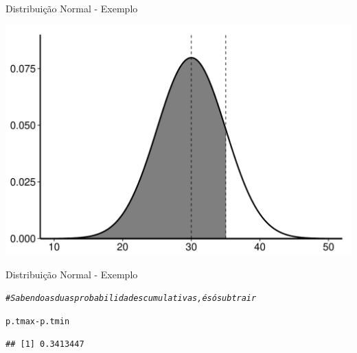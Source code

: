 \documentclass{beamer}\usepackage[]{graphicx}\usepackage[]{color}
\makeatletter
\def\maxwidth{ %
  \ifdim\Gin@nat@width>\linewidth
    \linewidth
  \else
    \Gin@nat@width
  \fi
}
\newcommand{\hlcom}[1]{\textcolor[rgb]{0.678,0.584,0.686}{\textit{#1}}}%
\newcommand{\hlopt}[1]{\textcolor[rgb]{0,0,0}{#1}}%
\newcommand{\hlstd}[1]{\textcolor[rgb]{0.345,0.345,0.345}{#1}}%
\newenvironment{kframe}{%
 \def\at@end@of@kframe{}%
 \ifinner\ifhmode%
  \def\at@end@of@kframe{\end{minipage}}%
  \begin{minipage}{\columnwidth}%
 \fi\fi%
 \def\FrameCommand##1{\hskip\@totalleftmargin \hskip-\fboxsep
 \colorbox{shadecolor}{##1}\hskip-\fboxsep
     \hskip-\linewidth \hskip-\@totalleftmargin \hskip\columnwidth}%
 \MakeFramed {\advance\hsize-\width
   \@totalleftmargin\z@ \linewidth\hsize
   \@setminipage}}%
 {\par\unskip\endMakeFramed%
 \at@end@of@kframe}
\newenvironment{knitrout}{}{} %
\renewenvironment{knitrout}{\setlength{\topsep}{0mm}}{}
\makeatother
\begin{document}
\begin{frame}[fragile]{Distribuição Normal - Exemplo}

\begin{knitrout}
\color{fgcolor}
\includegraphics[width=\maxwidth,height=0.7\textheight]{figure/cumnormplot2-1} 

\end{knitrout}

\end{frame} 

\begin{frame}[fragile]{Distribuição Normal - Exemplo}


\begin{knitrout}\tiny
{}\color{fgcolor}\begin{kframe}
\begin{alltt}
\hlcom{# Sabendo as duas probabilidades cumulativas, é só subtrair}

\hlstd{p.tmax} \hlopt{-} \hlstd{p.tmin}
\end{alltt}
\begin{verbatim}
## [1] 0.3413447
\end{verbatim}
\end{kframe}
\end{knitrout}

\end{frame} 
\end{document}
